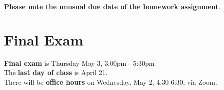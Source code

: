 \documentclass[12pt]{article}
\begin{document}
\noindent \textbf{Please note the unusual due date of the homework assignment}.


\newpage
\section[Final Exam]{Final Exam}

\textbf{Final exam} is Thursday May 3, 3:00pm - 5:30pm
\\

\noindent The \textbf{last day of class} is April 21. 
\\

\noindent There will be \textbf{office hours} on Wednesday, May 2, 4:30-6:30, via Zoom. 
\\














 
\end{document}
